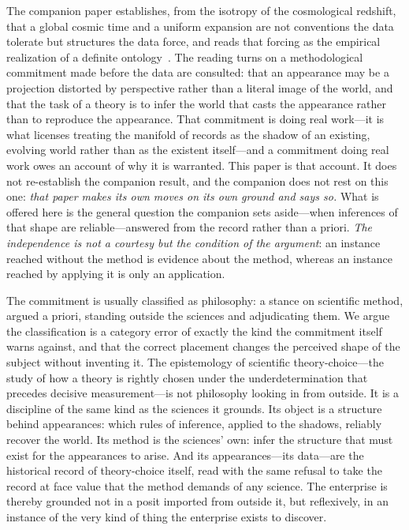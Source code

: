 \documentclass[11pt,a4paper]{article}
\begin{document}
The companion paper establishes, from the isotropy of the cosmological redshift, that a global cosmic time and a uniform expansion are not conventions the data tolerate but structures the data force, and reads that forcing as the empirical realization of a definite ontology~\cite{JanzenModernParallax}. The reading turns on a methodological commitment made before the data are consulted: that an appearance may be a projection distorted by perspective rather than a literal image of the world, and that the task of a theory is to infer the world that casts the appearance rather than to reproduce the appearance. That commitment is doing real work---it is what licenses treating the manifold of records as the shadow of an existing, evolving world rather than as the existent itself---and a commitment doing real work owes an account of why it is warranted. This paper is that account. It does not re-establish the companion result, and the companion does not rest on this one: \emph{that paper makes its own moves on its own ground and says so.} What is offered here is the general question the companion sets aside---when inferences of that shape are reliable---answered from the record rather than a priori. \emph{The independence is not a courtesy but the condition of the argument}: an instance reached without the method is evidence about the method, whereas an instance reached by applying it is only an application.

The commitment is usually classified as philosophy: a stance on scientific method, argued a priori, standing outside the sciences and adjudicating them. We argue the classification is a category error of exactly the kind the commitment itself warns against, and that the correct placement changes the perceived shape of the subject without inventing it. The epistemology of scientific theory-choice---the study of how a theory is rightly chosen under the underdetermination that precedes decisive measurement---is not philosophy looking in from outside. It is a discipline of the same kind as the sciences it grounds. Its object is a structure behind appearances: which rules of inference, applied to the shadows, reliably recover the world. Its method is the sciences' own: infer the structure that must exist for the appearances to arise. And its appearances---its data---are the historical record of theory-choice itself, read with the same refusal to take the record at face value that the method demands of any science. The enterprise is thereby grounded not in a posit imported from outside it, but reflexively, in an instance of the very kind of thing the enterprise exists to discover.
\end{document}
